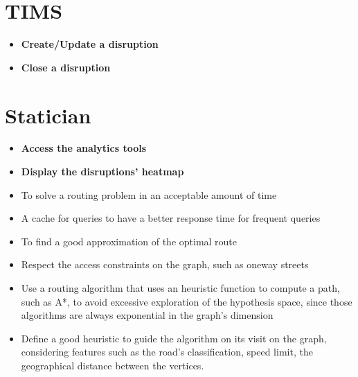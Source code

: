 \section{TIMS}
	\begin{itemize}
	\item \textbf{Create/Update a disruption}
	\item \textbf{Close a disruption}
	
	\end{itemize}
\section{Statician}
\begin{itemize}
	\item \textbf{Access the analytics tools}
	\item \textbf{Display the disruptions' heatmap}
\end{itemize}

	\begin{itemize}
	\item To solve a routing problem in an acceptable amount of time
	\item A cache for queries to have a better response time for frequent queries
	\item To find a good approximation of the optimal route
	\item Respect the access constraints on the graph, such as oneway streets
	\item Use a routing algorithm that uses an heuristic function to compute a path, such as A*, to avoid excessive exploration of the hypothesis space, since those algorithms are always exponential in the graph’s dimension
	\item Define a good heuristic to guide the algorithm on its visit on the graph, considering features such as the road’s classification, speed limit, the geographical distance between the vertices.
	\end{itemize}


